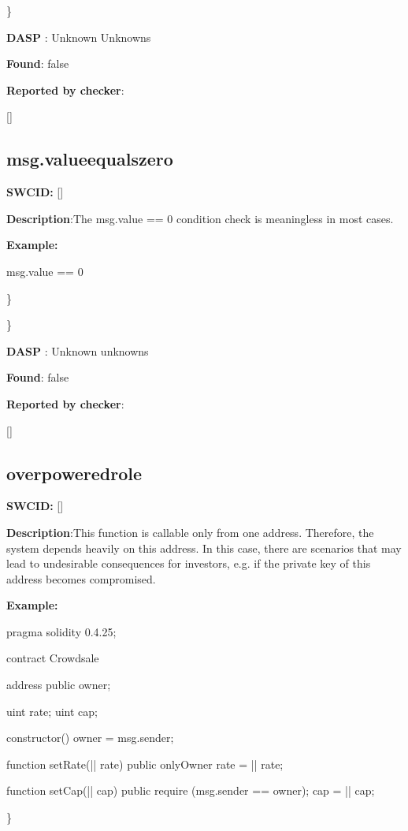 \documentclass{article}
\begin{document}
\} 

\textbf{DASP} : Unknown Unknowns

\textbf{Found}: false

\textbf{Reported by checker}: 
\begin{ffcode} 

[]
\end{ffcode} 
\subsection{msg.value{\textunderscore}equals{\textunderscore}zero} 
\textbf{SWC{\textunderscore}ID:} []

\textbf{Description}:The msg.value == 0 condition check is meaningless in most cases.


\textbf{Example:} 
\begin{ffcode} 

msg.value == 0

\end{ffcode} 
\} 

\} 

\textbf{DASP} : Unknown unknowns

\textbf{Found}: false

\textbf{Reported by checker}: 
\begin{ffcode} 

[]
\end{ffcode} 
\subsection{overpowered{\textunderscore}role} 
\textbf{SWC{\textunderscore}ID:} []

\textbf{Description}:This function is callable only from one address. Therefore, the system depends heavily on this address. In this case, there are scenarios that may lead to undesirable consequences for investors, e.g. if the private key of this address becomes compromised.


\textbf{Example:} 
\begin{ffcode} 

pragma solidity 0.4.25;

contract Crowdsale {

    address public owner;

    uint rate;
    uint cap;

    constructor() {
        owner = msg.sender;
    }

    function setRate(|\textunderscore| rate) public onlyOwner {
        rate = |\textunderscore| rate;
    }

    function setCap(|\textunderscore| cap) public {
        require (msg.sender == owner);
        cap = |\textunderscore| cap;
    }
}

\end{ffcode} 
\} 
\end{document}
